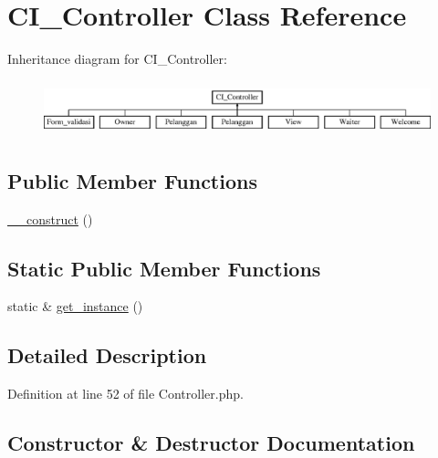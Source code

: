 \hypertarget{class_c_i___controller}{}\section{C\+I\+\_\+\+Controller Class Reference}
\label{class_c_i___controller}
Inheritance diagram for C\+I\+\_\+\+Controller\+:\begin{figure}[H]
\begin{center}
\leavevmode
\includegraphics[height=1.616162cm]{class_c_i___controller}
\end{center}
\end{figure}
\subsection*{Public Member Functions}
\begin{DoxyCompactItemize}
\item 
\mbox{\hyperlink{class_c_i___controller_a095c5d389db211932136b53f25f39685}{\+\_\+\+\_\+construct}} ()
\end{DoxyCompactItemize}
\subsection*{Static Public Member Functions}
\begin{DoxyCompactItemize}
\item 
static \& \mbox{\hyperlink{class_c_i___controller_a8d3cc57e7b6ec94e704712b0f277f5bb}{get\+\_\+instance}} ()
\end{DoxyCompactItemize}


\subsection{Detailed Description}


Definition at line 52 of file Controller.\+php.



\subsection{Constructor \& Destructor Documentation}
\mbox{\label{class_c_i___controller_a095c5d389db211932136b53f25f39685}} 
